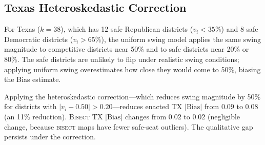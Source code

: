 \subsection{Texas Heteroskedastic Correction}

For Texas ($k=38$), which has 12 safe Republican districts ($v_i < 35\%$)
and 8 safe Democratic districts ($v_i > 65\%$), the uniform swing model applies
the same swing magnitude to competitive districts near 50\% and to safe districts
near 20\% or 80\%. The safe districts are unlikely to flip under realistic
swing conditions; applying uniform swing overestimates how close they would
come to 50\%, biasing the Bias estimate.

Applying the heteroskedastic correction---which reduces swing magnitude by
50\% for districts with $|v_i - 0.50| > 0.20$---reduces enacted TX
$|\text{Bias}|$ from $0.09$ to $0.08$ (an 11\% reduction). \textsc{Bisect}
TX $|\text{Bias}|$ changes from $0.02$ to $0.02$ (negligible change, because
\textsc{bisect} maps have fewer safe-seat outliers). The qualitative gap
persists under the correction.
